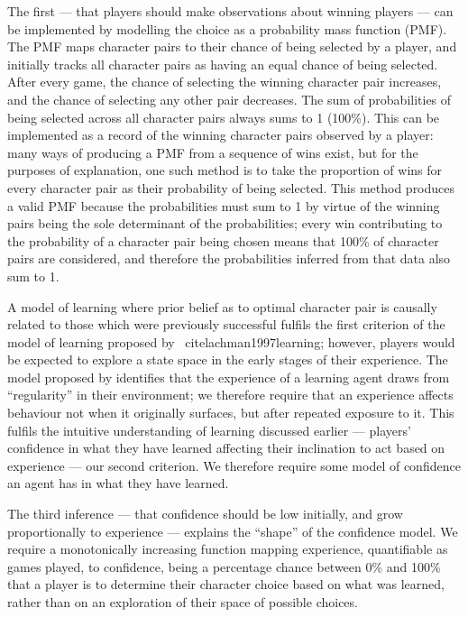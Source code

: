 The first --- that players should make observations about winning players --- can
be implemented by modelling the choice as a probability mass function (PMF). The PMF
maps character pairs to their chance of being selected by a player, and initially tracks
all character pairs as having an equal chance of being selected. After every game, the chance
of selecting the winning character pair increases, and the chance of selecting any other pair
decreases. The sum of probabilities of being selected across all character pairs always sums
to 1 (100\%). This can be implemented as a record of the winning character pairs observed by
a player: many ways of producing a PMF from a sequence of wins exist, but for the purposes of
explanation, one such method is to take the proportion of wins for every character pair as 
their probability of being selected. This method produces a valid PMF because the probabilities
must sum to 1 by virtue of the winning pairs being the sole determinant of the probabilities;
every win contributing to the probability of a character pair being chosen means that
100\% of character pairs are considered, and therefore the probabilities inferred from that data
also sum to 1.

A model of learning where prior belief as to optimal character pair is causally related to
those which were previously successful fulfils the first criterion of the model of learning proposed
by \citeauthor{lachman1997learning}~cite{lachman1997learning}; however, players would be expected to
explore a state space in the early stages of their experience. The model proposed by
\citeauthor{lachman1997learning} identifies that the experience of a learning agent draws from
``regularity'' in their environment; we therefore require that an experience affects behaviour
not when it originally surfaces, but after repeated exposure to it. This fulfils the intuitive
understanding of learning discussed earlier --- players' confidence in what they have learned affecting
their inclination to act based on experience --- our second criterion. We therefore require some model of
confidence an agent has in what they have learned.

The third inference --- that confidence should be low initially, and grow proportionally to experience ---
explains the ``shape'' of the confidence model. We require a monotonically increasing function mapping
experience, quantifiable as games played, to confidence, being a percentage chance between 0\% and 100\% that
a player is to determine their character choice based on what was learned, rather than on an exploration of
their space of possible choices.

